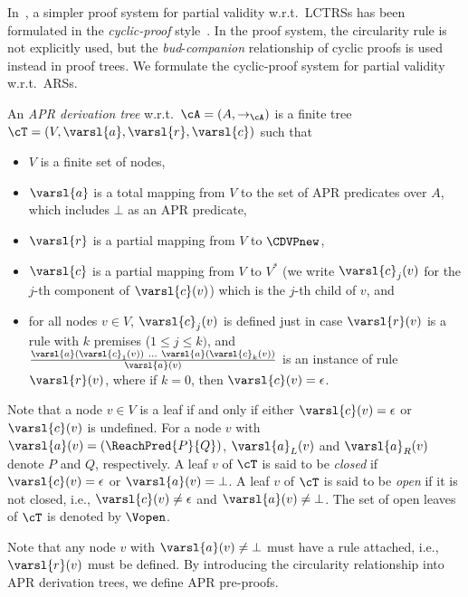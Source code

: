 In~\cite{KN24jip}, a simpler proof system for partial validity w.r.t.\ LCTRSs has been formulated in the \emph{cyclic-proof} style~\cite{Bro05}.
In the proof system, the circularity rule is not explicitly used, but the \emph{bud}-\emph{companion} relationship of cyclic proofs is used instead in proof trees.
We formulate the cyclic-proof system for partial validity w.r.t.\ ARSs.
\begin{definition}
	\label{def:APR-derivation-tree}
	An \emph{APR derivation tree} w.r.t.\ $\cA=(A,\to_\cA)$ is a finite tree $\cT=(V,\varsl{a},\varsl{r},\varsl{c})$ such that
	\begin{itemize}
		\item $V$ is a finite set of nodes,
		\item $\varsl{a}$ is a total mapping from $V$ to the set of APR predicates over $A$, which includes $\bot$ as an APR predicate, \item $\varsl{r}$ is a partial mapping from $V$ to $\CDVPnew$,
		\item $\varsl{c}$ is a partial mapping from $V$ to $V^*$ (we write $\varsl{c}_j(v)$ for the $j$-th component of $\varsl{c}(v)$) which is the $j$-th child of $v$,
		      and
		\item for all nodes $v \in V$, $\varsl{c}_j(v)$ is defined just in case $\varsl{r}(v)$ is a rule with $k$ premises ($1 \leq j \leq k)$, and $\frac{\varsl{a}(\varsl{c}_1(v)) ~ \ldots ~ \varsl{a}(\varsl{c}_k(v))}{\varsl{a}(v)}$ is an instance of rule $\varsl{r}(v)$,
		      where if $k=0$, then $\varsl{c}(v)=\epsilon$.
	\end{itemize}
	Note that a node $v \in V$ is a leaf if and only if either $\varsl{c}(v)=\epsilon$ or $\varsl{c}(v)$ is undefined.
	For a node $v$ with $\varsl{a}(v) = (\ReachPred{P}{Q})$, $\varsl{a}_L(v)$ and $\varsl{a}_R(v)$ denote $P$ and $Q$, respectively.
	A leaf $v$ of $\cT$ is said to be \emph{closed} if $\varsl{c}(v)=\epsilon$ or $\varsl{a}(v)=\bot$.
	A leaf $v$ of $\cT$ is said to be \emph{open} if it is not closed, i.e., $\varsl{c}(v)\ne\epsilon$ and $\varsl{a}(v)\ne\bot$.
	The set of open leaves of $\cT$ is denoted by $\Vopen$.
\end{definition}
Note that any node $v$ with $\varsl{a}(v)\ne \bot$ must have a rule attached, i.e., $\varsl{r}(v)$ must be defined.
By introducing the circularity relationship into APR derivation trees, we define APR pre-proofs.
